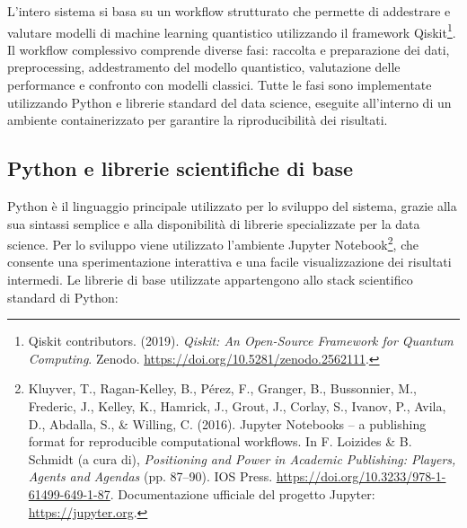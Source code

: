 L'intero sistema si basa su un workflow strutturato che permette di addestrare e valutare modelli di machine learning quantistico utilizzando il framework Qiskit\footnote{Qiskit contributors. (2019). \textit{Qiskit: An Open-Source Framework for Quantum Computing}. Zenodo. \url{https://doi.org/10.5281/zenodo.2562111}.}. Il workflow complessivo comprende diverse fasi: raccolta e preparazione dei dati, preprocessing, addestramento del modello quantistico, valutazione delle performance e confronto con modelli classici. Tutte le fasi sono implementate utilizzando Python e librerie standard del data science, eseguite all'interno di un ambiente containerizzato per garantire la riproducibilità dei risultati.

\subsection{Python e librerie scientifiche di base}
Python è il linguaggio principale utilizzato per lo sviluppo del sistema, grazie alla sua sintassi semplice e alla disponibilità di librerie specializzate per la data science.
Per lo sviluppo viene utilizzato l'ambiente Jupyter Notebook\footnote{Kluyver, T., Ragan-Kelley, B., Pérez, F., Granger, B., Bussonnier, M., Frederic, J., Kelley, K., Hamrick, J., Grout, J., Corlay, S., Ivanov, P., Avila, D., Abdalla, S., \& Willing, C. (2016). Jupyter Notebooks -- a publishing format for reproducible computational workflows. In F. Loizides \& B. Schmidt (a cura di), \textit{Positioning and Power in Academic Publishing: Players, Agents and Agendas} (pp. 87--90). IOS Press. \url{https://doi.org/10.3233/978-1-61499-649-1-87}. Documentazione ufficiale del progetto Jupyter: \url{https://jupyter.org}.}, che consente una sperimentazione interattiva e una facile visualizzazione dei risultati intermedi. Le librerie di base utilizzate appartengono allo stack scientifico standard di Python:

